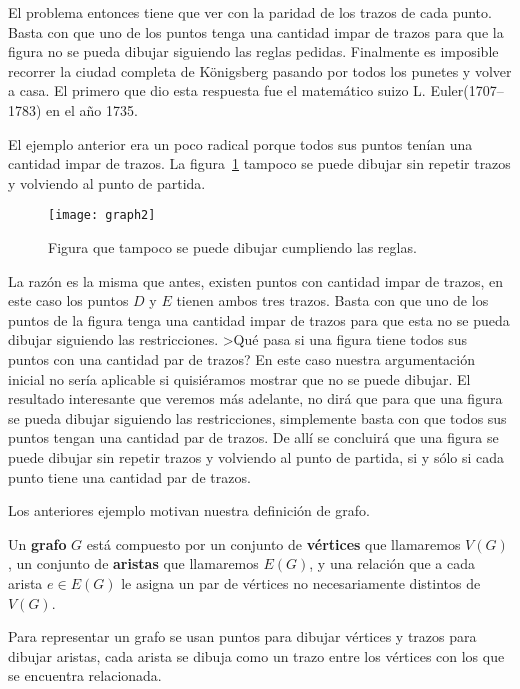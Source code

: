 \begin{ejemplo}
El problema entonces tiene que ver con la paridad de los trazos de cada punto.
Basta con que uno de los puntos tenga una cantidad impar de trazos para que la figura no se pueda dibujar siguiendo las reglas pedidas.
Finalmente es imposible recorrer la ciudad completa de K\"onigsberg pasando por todos los punetes y volver a casa.
El primero que dio esta respuesta fue el matemático suizo L. Euler(1707--1783) en el año 1735.
\end{ejemplo}

\begin{ejemplo}
El ejemplo anterior era un poco radical porque todos sus puntos tenían una cantidad impar de trazos.
La figura~\ref{fig:graph2} tampoco se puede dibujar sin repetir trazos y volviendo al punto de partida.

\begin{figure}[h!]
\centering
\texttt{[image: graph2]}
\caption{Figura que tampoco se puede dibujar cumpliendo las reglas.}
\label{fig:graph2}
\end{figure}

La razón es la misma que antes, existen puntos con cantidad impar de trazos, en este caso los puntos $D$ y $E$ tienen ambos tres trazos.
Basta con que uno de los puntos de la figura tenga una cantidad impar de trazos para que esta no se pueda dibujar siguiendo las restricciones.
>Qué pasa si una figura tiene todos sus puntos con una cantidad par de trazos?
En este caso nuestra argumentación inicial no sería aplicable si quisiéramos mostrar que no se puede dibujar.
El resultado interesante que veremos más adelante, no dirá que para que una figura se pueda dibujar siguiendo las restricciones, simplemente basta con que todos sus puntos tengan una cantidad par de trazos.
De allí se concluirá que una figura se puede dibujar sin repetir trazos y volviendo al punto de partida, si y sólo si cada punto tiene una cantidad par de trazos.
\end{ejemplo}

Los anteriores ejemplo motivan nuestra definición de grafo.

\begin{definicion}
Un {\bf grafo} $G$ está compuesto por un conjunto de {\bf vértices} que llamaremos $V(G)$, un conjunto de {\bf aristas} que llamaremos $E(G)$, y una relación que a cada arista $e\in E(G)$ le asigna un par de vértices no necesariamente distintos de $V(G)$.

Para representar un grafo se usan puntos para dibujar vértices y trazos para dibujar aristas, cada arista se dibuja como un trazo entre los vértices con los que se encuentra relacionada.
\end{definicion}

